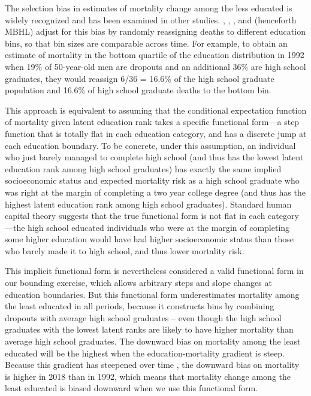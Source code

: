 The selection bias in estimates of mortality change among the less educated is widely recognized and has been examined in other studies. \citet{Meara2008}, \citet{Bound2015}, \citet{Hendi2015}, and \citet{Leive2020} (henceforth MBHL) adjust for this bias by randomly reassigning deaths to different education bins, so that bin sizes are comparable across time. For example, to obtain an estimate of mortality in the bottom quartile of the education distribution in 1992 when 19\% of 50-year-old men are dropouts and an additional 36\% are high school graduates, they would reassign 6/36 = 16.6\% of the high school graduate population and 16.6\% of high school graduate deaths to the bottom bin.

This approach is equivalent to assuming that the conditional expectation function of mortality given latent education rank takes a specific functional form---a step function that is totally flat in each education category, and has a discrete jump at each education boundary. To be concrete, under this assumption, an individual who just barely managed to complete high school (and thus has the lowest latent education rank among high school graduates) has exactly the same implied socioeconomic status and expected mortality risk as a high school graduate who was right at the margin of completing a two year college degree (and thus has the highest latent education rank among high school graduates). Standard human capital theory suggests that the true functional form is not flat in each category---the high school educated individuals who were at the margin of completing some higher education would have had higher socioeconomic status than those who barely made it to high school, and thus lower mortality risk.

This implicit functional form is nevertheless considered a valid functional form in our bounding exercise, which allows arbitrary steps and slope changes at education boundaries. But this functional form underestimates mortality among the least educated in all periods, because it constructs bins by combining dropouts with average high school graduates -- even though the high school graduates with the lowest latent ranks are likely to have higher mortality than average high school graduates.  The downward bias on mortality among the least educated will be the highest when the education-mortality gradient is steep. Because this gradient has steepened over time \citep{Goldring2016}, the downward bias on mortality is higher in 2018 than in 1992, which means that mortality change among the least educated is biased downward when we use this functional form.

